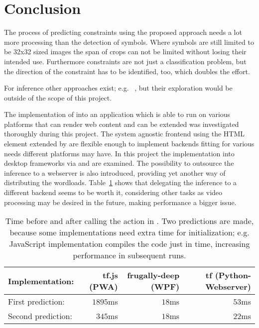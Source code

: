 \section{Conclusion}

The process of predicting constraints using the proposed approach needs a lot more processing than the detection of symbols.
Where symbols are still limited to be 32x32 sized images the span of crops can not be limited without losing their intended use.
Furthermore constraints are not just a classification problem, but the direction of the constraint has to be identified, too, which doubles the effort.

For inference other approaches exist; e.g. ~\cite{Bochkovskiy2020}, but their exploration would be outside of the scope of this project.

The implementation of  into an application which is able to run on various platforms that can render web content and can be extended was investigated thoroughly during this project.
The system agnostic frontend using the  HTML element extended by  are flexible enough to implement backends fitting for various needs different platforms may have.
In this project the implementation into desktop frameworks via  and  are examined.
The possibility to outsource the inference to a webserver is also introduced, providing yet another way of distributing the wordloads.
Table~\ref{tab:benchmarks} shows that delegating the inference to a different backend seems to be worth it, considering other tasks as video processing may be desired in the future, making performance a bigger issue.

\begin{table}
    \caption{Time before and after calling the  action in . Two predictions are made, because some implementations need extra time for initialization; e.g. JavaScript implementation compiles the code just in time, increasing performance in subsequent runs.}\label{tab:benchmarks}
\begin{tabular}{lrrr}
    \toprule
    Implementation: & tf.js (PWA) & frugally-deep (WPF) & tf (Python-Webserver) \\
    \midrule
    First prediction: & \(1895\)ms & \(18\)ms & \(53\)ms \\
    \midrule
    Second prediction: & \(345\)ms & \(18\)ms & \(22\)ms \\
    \bottomrule
\end{tabular}
\end{table}


